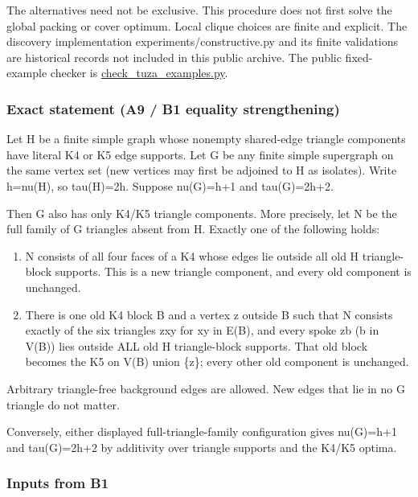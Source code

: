 \documentclass[11pt]{article}
\begin{document}
The alternatives need not be exclusive. This procedure does not first solve the global packing or cover optimum. Local clique choices are finite and explicit. The discovery implementation experiments/constructive.py and its finite validations are historical records not included in this public archive. The public fixed-example checker is \href{https://github.com/pappa211/ai-math-experiments/blob/main/tools/check_tuza_examples.py}{check\_tuza\_examples.py}.

\subsubsection{Exact statement (A9 / B1 equality strengthening)}\label{exact-statement-a9-b1-equality-strengthening}

Let H be a finite simple graph whose nonempty shared-edge triangle components have literal K4 or K5 edge supports. Let G be any finite simple supergraph on the same vertex set (new vertices may first be adjoined to H as isolates). Write h=nu(H), so tau(H)=2h. Suppose nu(G)=h+1 and tau(G)=2h+2.

Then G also has only K4/K5 triangle components. More precisely, let N be the full family of G triangles absent from H. Exactly one of the following holds:

\begin{enumerate}
\def\labelenumi{(\roman{enumi})}
\item
  N consists of all four faces of a K4 whose edges lie outside all old H triangle-block supports. This is a new triangle component, and every old component is unchanged.
\item
  There is one old K4 block B and a vertex z outside B such that N consists exactly of the six triangles zxy for xy in E(B), and every spoke zb (b in V(B)) lies outside ALL old H triangle-block supports. That old block becomes the K5 on V(B) union \{z\}; every other old component is unchanged.
\end{enumerate}

Arbitrary triangle-free background edges are allowed. New edges that lie in no G triangle do not matter.

Conversely, either displayed full-triangle-family configuration gives nu(G)=h+1 and tau(G)=2h+2 by additivity over triangle supports and the K4/K5 optima.

\subsubsection{Inputs from B1}\label{inputs-from-b1}
\end{document}
